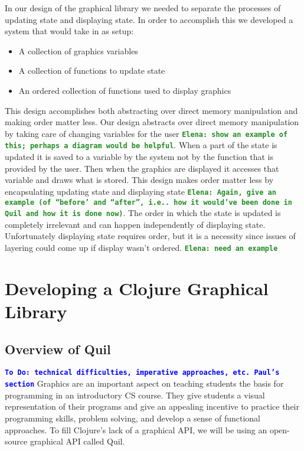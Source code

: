 \documentclass[12pt]{article}
\newcommand{\comment}[1]{{\bf \tt  {#1}}}
\newcommand{\emcomment}[1]{\textcolor{ForestGreen}{\comment{Elena: {#1}}}}
\newcommand{\todo}[1]{\textcolor{blue}{\comment{To Do: {#1}}}}
\begin{document}
In our design of the graphical library we needed to separate the processes of updating state and displaying state. In order to accomplish this we developed a system that would take in as setup: 
\begin{itemize}
	\item A collection of graphics variables 
	\item A collection of functions to update state
	\item An ordered collection of functions used to display graphics 
\end{itemize}
This design accomplishes both abstracting over direct memory manipulation and making order matter less. Our design abstracts over direct memory manipulation by taking care of changing variables for the user \emcomment{show an example of this; perhaps a diagram would be helpful}. When a part of the state is updated it is saved to a variable by the system not by the function that is provided by the user. Then when the graphics are displayed it accesses that variable and draws what is stored. This design makes order matter less by encapsulating updating state and displaying state \emcomment{Again, give an example (of ``before' and ``after'', i.e.. how it would've been done in Quil and how it is done now)}. The order in which the state is updated is completely irrelevant and can happen independently of displaying state. Unfortunately displaying state requires order, but it is a necessity since issues of layering could come up if display wasn't ordered.
\emcomment{need an example}

\section{Developing a Clojure Graphical Library}\label{sec:library}

\subsection{Overview of Quil}\label{subsec:quil}
\todo{technical difficulties, imperative approaches, etc. Paul's section}
Graphics are an important aspect on teaching students the basis for programming in an introductory CS course. They give students a visual representation of their programs and give an appealing incentive to practice their programming skills, problem solving, and develop a sense of functional approaches. To fill Clojure’s lack of a graphical API, we will be using an open-source graphical API called Quil.
\end{document}
